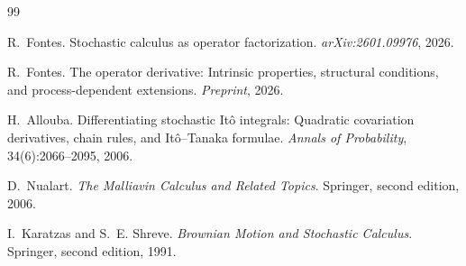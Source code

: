 \documentclass[11pt]{article}
\theoremstyle{plain}
\theoremstyle{definition}
\theoremstyle{remark}
\begin{document}

\begin{thebibliography}{99}

R.~Fontes.
\newblock Stochastic calculus as operator factorization.
\newblock \emph{arXiv:2601.09976}, 2026.

R.~Fontes.
\newblock The operator derivative: Intrinsic properties, structural conditions,
and process-dependent extensions.
\newblock \emph{Preprint}, 2026.

H.~Allouba.
\newblock Differentiating stochastic {I}t\^o integrals: Quadratic covariation
derivatives, chain rules, and {I}t\^o--{T}anaka formulae.
\newblock \emph{Annals of Probability}, 34(6):2066--2095, 2006.

D.~Nualart.
\newblock \emph{The {M}alliavin Calculus and Related Topics}.
\newblock Springer, second edition, 2006.

I.~Karatzas and S.~E. Shreve.
\newblock \emph{Brownian Motion and Stochastic Calculus}.
\newblock Springer, second edition, 1991.

\end{thebibliography}
\end{document}
